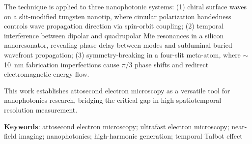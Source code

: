 The technique is applied to three nanophotonic systems: (1) chiral surface waves on a slit-modified tungsten nanotip, where circular polarization handedness controls wave propagation direction via spin-orbit coupling; (2) temporal interference between dipolar and quadrupolar Mie resonances in a silicon nanoresonator, revealing phase delay between modes and subluminal buried wavefront propagation; (3) symmetry-breaking in a four-slit meta-atom, where $\sim$\SI{10}{nm} fabrication imperfections cause $\pi/3$ phase shifts and redirect electromagnetic energy flow.

This work establishes attosecond electron microscopy as a versatile tool for nanophotonics research, bridging the critical gap in high spatiotemporal resolution measurement.

\bigskip
\noindent \textbf{Keywords}: attosecond electron microscopy; ultrafast electron microscopy; near-field imaging; nanophotonics; high-harmonic generation; temporal Talbot effect
